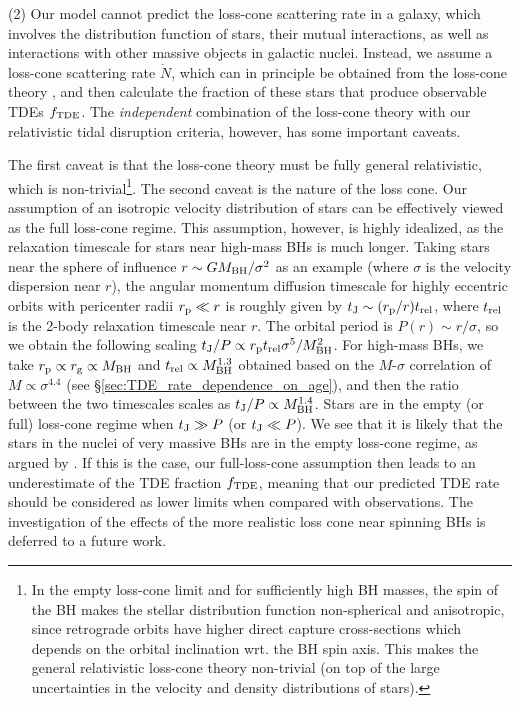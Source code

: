 \documentclass[useAMS,usenatbib]{mn2e}
\def\mBH{M_{\rm BH}}
\def\rg{r_{\rm g}}
\def\rp{r_{\rm p}}
\def\fTDE{f_{\rm TDE}}
\begin{document}
(2) Our model cannot predict the loss-cone scattering rate in a galaxy, which involves the distribution function of stars, their mutual interactions, as well as interactions with other massive objects in galactic nuclei. Instead, we assume a loss-cone scattering rate $\dot{N}$, which can in principle be obtained from the loss-cone theory \citep{Merritt2013}, and then calculate the fraction of these stars that produce observable TDEs $\fTDE$. The \textit{independent} combination of the loss-cone theory with our relativistic tidal disruption criteria, however, has some important caveats.

The first caveat is that the loss-cone theory must be fully general relativistic, which is non-trivial\footnote{In the empty loss-cone limit and for sufficiently high BH masses, the spin of the BH makes the stellar distribution function non-spherical and anisotropic, since retrograde orbits have higher direct capture cross-sections which depends on the orbital inclination wrt. the BH spin axis. This makes the general relativistic loss-cone theory non-trivial (on top of the large uncertainties in the velocity and density distributions of stars).}. The second caveat is the nature of the loss cone. Our assumption of an isotropic velocity distribution of stars can be effectively viewed as the full loss-cone regime. This assumption, however, is highly idealized, as the relaxation timescale for stars near high-mass BHs is much longer. Taking stars near the sphere of influence $r\sim G\mBH/\sigma^2$ as an example (where $\sigma$ is the velocity dispersion near $r$), the angular momentum diffusion timescale for highly eccentric orbits with pericenter radii $\rp\ll r$ is roughly given by $t_{\rm J} \sim (\rp/r)t_{\rm rel}$, where $t_{\rm rel}$ is the 2-body relaxation timescale near $r$. The orbital period is $P(r)\sim r/\sigma$, so we obtain the following scaling $t_{\rm J}/P \propto \rp t_{\rm rel}\sigma^5/\mBH^2$. For high-mass BHs, we take $\rp \propto \rg \propto \mBH$ and $t_{\rm rel}\propto \mBH^{1.3}$ obtained based on the $M$-$\sigma$ correlation of $M\propto \sigma^{4.4}$ (see \S \ref{sec:TDE_rate_dependence_on_age}), and then the ratio between the two timescales scales as $t_{\rm J}/P\propto \mBH^{1.4}$. Stars are in the empty (or full) loss-cone regime when $t_{\rm J}\gg P$ (or $t_{\rm J}\ll P$).
We see that it is likely that the stars in the nuclei of very massive BHs are in the empty loss-cone regime, as argued by \citet{Merritt2013}. If this is the case, our full-loss-cone assumption then leads to an underestimate of the TDE fraction $\fTDE$, meaning that our predicted TDE rate should be considered as lower limits when compared with observations.
The investigation of the effects of the more realistic loss cone near spinning BHs is deferred to a future work.
\end{document}
